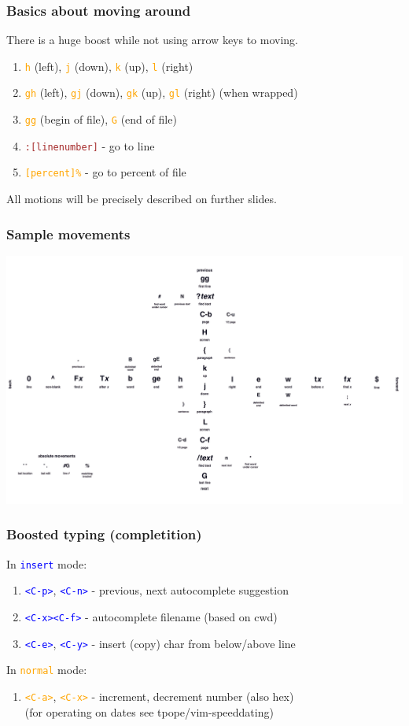 \documentclass{beamer}
\newcommand{\viminsert}[1]{\texttt{\textcolor{blue}{#1}}}
\newcommand{\vimnormal}[1]{\texttt{\textcolor{orange}{#1}}}
\newcommand{\vimcommand}[1]{\texttt{\textcolor{brown}{#1}}}
\newcommand{\vimkey}[1]{\textless{}#1\textgreater{}}
\begin{document}
\begin{frame}
    \frametitle{Basics about moving around}
    There is a huge boost while not using arrow keys to moving.
    \begin{enumerate}
        \item \vimnormal{h} (left), \vimnormal{j} (down), \vimnormal{k} (up), \vimnormal{l} (right) \\
        \item \vimnormal{gh} (left), \vimnormal{gj} (down), \vimnormal{gk} (up), \vimnormal{gl} (right) (when wrapped)\\
        \item \vimnormal{gg} (begin of file), \vimnormal{G} (end of file) \\
        \item \vimcommand{:[linenumber]} - go to line
        \item \vimnormal{[percent]\%} - go to percent of file
    \end{enumerate}
    All motions will be precisely described on further slides.
\end{frame}

\begin{frame}[fragile]
    \frametitle{Sample movements}
    \includegraphics[width=\textwidth]{vim_movements.png}
\end{frame}

\begin{frame}
    \frametitle{Boosted typing (completition)}
    In \viminsert{insert} mode:
    \begin{enumerate}
        \item \viminsert{\vimkey{C-p}}, \viminsert{\vimkey{C-n}} - previous, next autocomplete suggestion
        \item \viminsert{\vimkey{C-x}\vimkey{C-f}} - autocomplete filename (based on cwd)
        \item \viminsert{\vimkey{C-e}}, \viminsert{\vimkey{C-y}} - insert (copy) char from below/above line
    \end{enumerate}
    In \vimnormal{normal} mode:
    \begin{enumerate}
      \item \vimnormal{\vimkey{C-a}}, \vimnormal{\vimkey{C-x}} - increment, decrement number (also hex)\\
        (for operating on dates see tpope/vim-speeddating)
    \end{enumerate}
\end{frame}
\end{document}
